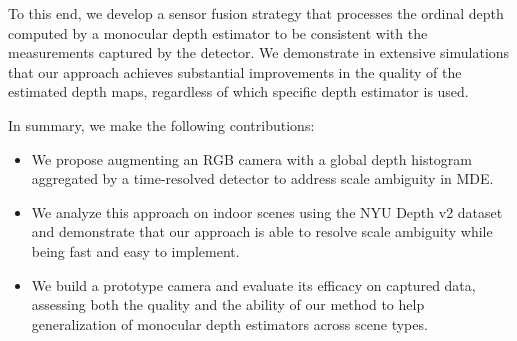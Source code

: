 

To this end, we develop a sensor fusion strategy that processes the ordinal
depth computed by a monocular depth estimator to be consistent with the
measurements captured by the  detector. We demonstrate in extensive
simulations that our approach achieves substantial improvements in the quality
of the estimated depth maps, regardless of which specific depth estimator is
used.  %

In summary, we make the
following contributions:
%
\begin{itemize}
	\item We propose augmenting an RGB camera with a global depth histogram aggregated by a time-resolved detector to address scale ambiguity in MDE.	
  \item We analyze this approach on indoor scenes using the NYU Depth v2 dataset and demonstrate that our approach is able to resolve scale ambiguity while being fast and easy to implement.
	\item We build a prototype camera and evaluate its efficacy on captured data, assessing both the quality and the ability of our method to help generalization of monocular depth estimators across scene types. 
\end{itemize}




